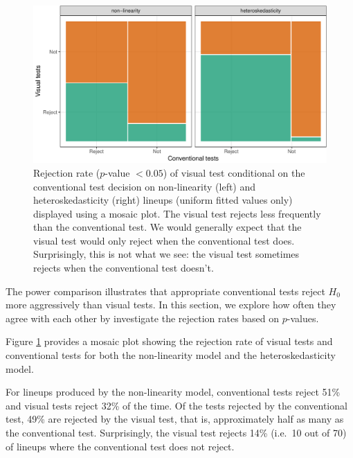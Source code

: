 \documentclass[]{interact}
\theoremstyle{plain}%
\theoremstyle{definition}
\theoremstyle{remark}
\begin{document}
\begin{figure}

{\centering \includegraphics[width=1\linewidth]{paper_comparison_files/figure-latex/p-value-comparison-1} 

}

\caption{Rejection rate ($p$-value $<0.05$) of visual test conditional on the conventional test decision on non-linearity (left) and heteroskedasticity (right) lineups (uniform fitted values only) displayed using a mosaic plot. The visual test rejects less frequently than the conventional test. We would generally expect that the visual test would only reject when the conventional test does. Surprisingly, this is not what we see: the visual test sometimes rejects when the conventional test doesn't. }\label{fig:p-value-comparison}
\end{figure}

The power comparison illustrates that appropriate conventional tests
reject \(H_0\) more aggressively than visual tests. In this section, we
explore how often they agree with each other by investigate the
rejection rates based on \(p\)-values.

Figure \ref{fig:p-value-comparison} provides a mosaic plot showing the
rejection rate of visual tests and conventional tests for both the
non-linearity model and the heteroskedasticity model.

For lineups produced by the non-linearity model, conventional tests
reject 51\% and visual tests reject 32\% of the time. Of the tests
rejected by the conventional test, 49\% are rejected by the visual test,
that is, approximately half as many as the conventional test.
Surprisingly, the visual test rejects 14\% (i.e.~10 out of 70) of
lineups where the conventional test does not reject.
\end{document}
